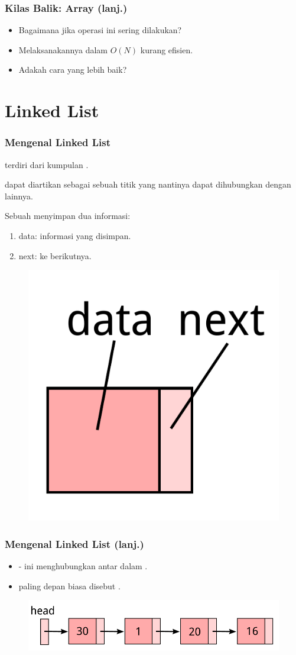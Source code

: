 \begin{frame}
\frametitle{Kilas Balik: Array (lanj.)}
\begin{itemize}
  \item Bagaimana jika operasi ini sering dilakukan?
  \item Melaksanakannya dalam $O(N)$ kurang efisien.
  \item Adakah cara yang lebih baik?
\end{itemize}
\end{frame}

\section{Linked List}
\frame{\sectionpage}

\begin{frame}
\frametitle{Mengenal Linked List}
 terdiri dari kumpulan \alert{}.\newline

 dapat diartikan sebagai sebuah titik yang nantinya dapat dihubungkan dengan  lainnya.\newline

Sebuah  menyimpan dua informasi:
\begin{enumerate}
  \item data: informasi yang disimpan.
  \item next:  ke  berikutnya.
\end{enumerate}
\begin{figure}
  \centering \includegraphics[width=2 cm]{asset/singly-node.pdf}
\end{figure}

\end{frame}

\begin{frame}
\frametitle{Mengenal Linked List (lanj.)}
\begin{itemize}
  \item {}- ini menghubungkan antar  dalam .
  \item {} paling depan biasa disebut \alert{}.
\end{itemize}
\begin{figure}
  \centering \includegraphics[width=8 cm]{asset/singly-linked-list.pdf}
\end{figure}
\end{frame}

